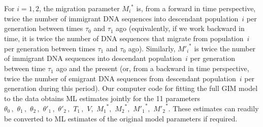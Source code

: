 \documentclass[11pt]{article}
\begin{document}
For $i=1,2$, the migration parameter ${M_i}^{\!*}$ is, from a forward in time perspective, twice the number of immigrant DNA sequences into descendant population~$i$ per generation between times $\tau_0$ and $\tau_1$ ago (equivalently, if we work backward in time, it is  twice the number of DNA sequences that migrate from population~$i$ per generation  between times $\tau_1$ and $\tau_0$ ago).
Similarly, ${M'_i}^{*}$ is twice the number of immigrant DNA sequences into descendant population~$i$ per generation between time $\tau_1$ ago and the present (or, from a backward in time perspective, twice the number of emigrant DNA sequences from descendant population~$i$ per generation during this period).
Our computer code for fitting the full GIM model to the data obtains ML estimates jointly for the 11 parameters
$\theta_0\,,\,\, \theta_1\,,\,\, \theta_2\,,\,\, \theta'_1\,,\,\, \theta'_2\,,\,\, T_1\,,\,\, V,\,\, {M_1}^{\!*},\,\, {M_2}^{\!*},\,\, {M'_1}^{*},\,\, {M'_2}^{*}.$
These estimates can readily be converted to ML estimates of the original model parameters if required. 
\end{document}
